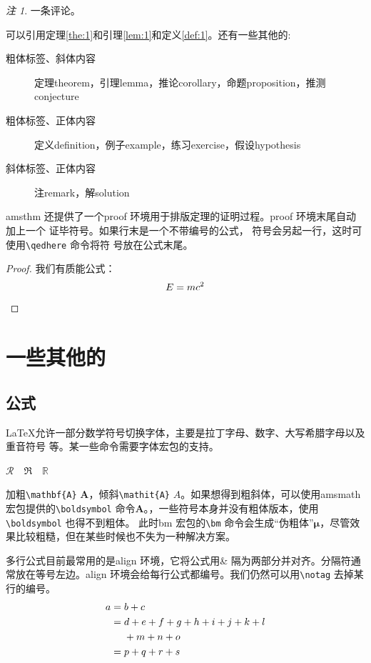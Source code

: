 \documentclass{ctexart}
\theoremstyle{plain} 		     %
\theoremstyle{definition} 		 %
\theoremstyle{remark} 			 %
\newtheorem*{remark}{注}
\begin{document}
\begin{remark}
	一条评论。
\end{remark}

可以引用定理\ref{the:1}和引理\ref{lem:1}和定义\ref{def:1}。还有一些其他的:
\begin{description}
	\item[粗体标签、斜体内容] 定理theorem，引理lemma，推论corollary，命题proposition，推测conjecture
	\item[粗体标签、正体内容] 定义definition，例子example，练习exercise，假设hypothesis
	\item[斜体标签、正体内容] 注remark，解solution
\end{description}

amsthm 还提供了一个proof 环境用于排版定理的证明过程。proof 环境末尾自动加上一个
证毕符号。如果行末是一个不带编号的公式， 符号会另起一行，这时可使用\verb|\qedhere| 命令将符
号放在公式末尾。
\begin{proof}
	我们有质能公式：
	\[
	E=mc^2 \qedhere
	\]
\end{proof}

\section{一些其他的}
\subsection{公式} \label{subsec:equ}
\LaTeX 允许一部分数学符号切换字体，主要是拉丁字母、数字、大写希腊字母以及重音符号
等。某一些命令需要字体宏包的支持。

$\mathcal{R} \quad \mathfrak{R} \quad \mathbb{R}$

加粗\verb|\mathbf{A}| $\mathbf{A}$，倾斜\verb|\mathit{A}| $\mathit{A}$。如果想得到粗斜体，可以使用amsmath宏包提供的\verb|\boldsymbol| 命令$\boldsymbol{A}$。，一些符号本身并没有粗体版本，使用\verb|\boldsymbol| 也得不到粗体。
此时bm 宏包的\verb|\bm| 命令会生成“伪粗体”$\bm{\mu}$，尽管效果比较粗糙，但在某些时候也不失为一种解决方案。

多行公式目前最常用的是align 环境，它将公式用\& 隔为两部分并对齐。分隔符通常放在等号左边。align 环境会给每行公式都编号。我们仍然可以用\verb|\notag| 去掉某行的编号。
\begin{align}
	a ={} & b + c \\
	={} & d + e + f + g + h + i
	+ j + k + l \notag \\
	& + m + n + o \\
	={} & p + q + r + s
\end{align}
\end{document}
